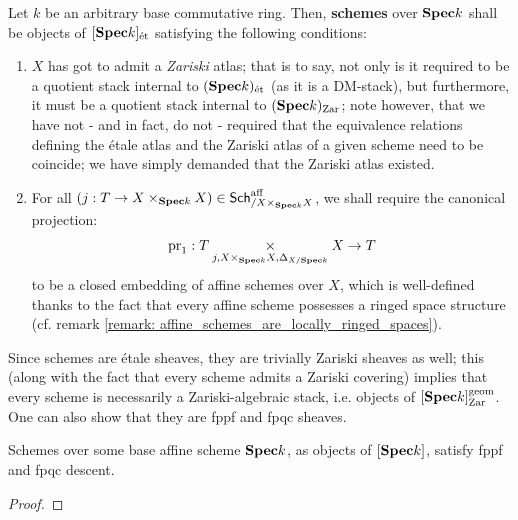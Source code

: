                 \begin{definition} \label{def: schemes} 
                    Let $k$ be an arbitrary base commutative ring. Then, \textbf{schemes} over $\mathbf{Spec} k$ shall be objects of $[\mathbf{Spec} k]_{\mathrm{\acute{e}t}}$ satisfying the following conditions:
                        \begin{enumerate}
                            \item $X$ has got to admit a \textit{Zariski} atlas; that is to say, not only is it required to be a quotient stack internal to $(\mathbf{Spec} k)_{\mathrm{\acute{e}t}}$ (as it is a DM-stack), but furthermore, it must be a quotient stack internal to $(\mathbf{Spec} k)_{\mathrm{Zar}}$; note however, that we have not - and in fact, do not - required that the equivalence relations defining the \'etale atlas and the Zariski atlas of a given scheme need to be coincide; we have simply demanded that the Zariski atlas existed. 
                            \item For all $(j: T \to X \x_{\Spec k} X) \in \Sch^{\aff}_{/X \x_{\Spec k} X}$, we shall require the canonical projection:
                                $$\pr_1: T \x_{j, X \x_{\Spec k} X, \Delta_{X/\Spec k}} X \to T$$
                            to be a closed embedding of affine schemes over $X$, which is well-defined thanks to the fact that every affine scheme possesses a ringed space structure (cf. remark \ref{remark: affine_schemes_are_locally_ringed_spaces}).
                        \end{enumerate}
                \end{definition}
                \begin{remark} \label{remark: schemes_are_zariski_algebraic_stacks}
                    Since schemes are \'etale sheaves, they are trivially Zariski sheaves as well; this (along with the fact that every scheme admits a Zariski covering) implies that every scheme is necessarily a Zariski-algebraic stack, i.e. objects of $[\mathbf{Spec} k]_{\mathrm{Zar}}^{\mathrm{geom}}$. One can also show that they are fppf and fpqc sheaves.
                \end{remark}
                
                \begin{proposition} \label{prop: schemes_are_flat_sheaves}
                    Schemes over some base affine scheme $\mathbf{Spec} k$, as objects of $[\mathbf{Spec} k]$, satisfy fppf and fpqc descent.
                \end{proposition}
                    \begin{proof}
                        
                    \end{proof}
                
